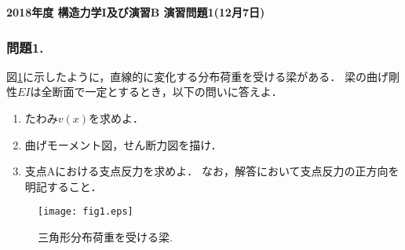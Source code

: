 \documentclass[10pt,a4j]{jarticle}
\newlength{\minitwocolumn}
\begin{document}
\newcommand{\fat}[1]{\mbox{\boldmath $#1$}}
\newcommand{\D}{\partial}
\newcommand{\w}{\omega}
\newcommand{\ga}{\alpha}
\newcommand{\gb}{\beta}
\newcommand{\gx}{\xi}
\newcommand{\gz}{\zeta}
\newcommand{\vhat}[1]{\hat{\fat{#1}}}
\newcommand{\spc}{\vspace{0.7\baselineskip}}
\newcommand{\halfspc}{\vspace{0.3\baselineskip}}

\pagestyle{empty}
\newcommand{\twofig}[2]
 {
   \begin{figure}[h]
     \begin{minipage}[t]{\minitwocolumn}
         \begin{center}   #1
         \end{center}
     \end{minipage}
         \hspace{\columnsep}
     \begin{minipage}[t]{\minitwocolumn}
         \begin{center} #2
         \end{center}
     \end{minipage}
   \end{figure}
 }
\begin{center}
{\Large \bf 2018年度 構造力学I及び演習B 演習問題1(12月7日)} \\
\end{center}
\subsubsection*{問題1. }
図\ref{fig:fig1}に示したように，直線的に変化する分布荷重を受ける梁がある．
梁の曲げ剛性$EI$は全断面で一定とするとき，以下の問いに答えよ．
\begin{enumerate}
\item
	たわみ$v(x)$を求めよ．
\item
	曲げモーメント図，せん断力図を描け．
\item
	支点Aにおける支点反力を求めよ．
	なお，解答において支点反力の正方向を明記すること．
\end{enumerate}
\begin{figure}[h]
	\begin{center}
	\texttt{[image: fig1.eps]} 
	\end{center}
	\vspace{-5mm}
	\caption{三角形分布荷重を受ける梁.}
	\label{fig:fig1}
\end{figure}
\end{document}
